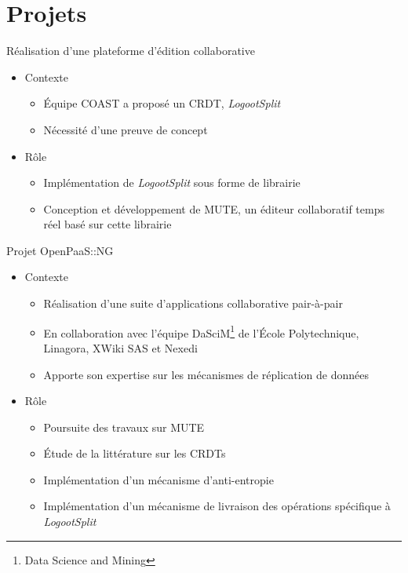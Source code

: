 \documentclass[xcolor=table]{beamer}
\begin{document}
\section{Projets}

\begin{frame}{Réalisation d'une plateforme d'édition collaborative}
  \begin{itemize}
	\item Contexte
		\begin{itemize}
		\item Équipe COAST a proposé un CRDT, \emph{LogootSplit}
		\item Nécessité d'une preuve de concept
		\end{itemize}
  \item Rôle
		\begin{itemize}
		\item Implémentation de \emph{LogootSplit} sous forme de librairie
		\item Conception et développement de MUTE, un éditeur collaboratif temps réel basé sur cette librairie
		\end{itemize}
  \end{itemize}
\end{frame}

\begin{frame}{Projet OpenPaaS::NG}
  \begin{itemize}
  \item Contexte
		\begin{itemize}
		\item Réalisation d'une suite d'applications collaborative pair-à-pair
		\item En collaboration avec l'équipe DaSciM\footnote{Data Science and Mining} de l'École Polytechnique, Linagora, XWiki SAS et Nexedi
		\item Apporte son expertise sur les mécanismes de réplication de données
		\end{itemize}
  \item Rôle
		\begin{itemize}
		\item Poursuite des travaux sur MUTE
		\item Étude de la littérature sur les CRDTs
		\item Implémentation d'un mécanisme d'anti-entropie
		\item Implémentation d'un mécanisme de livraison des opérations spécifique à \emph{LogootSplit}
		\end{itemize}
	\end{itemize}
\end{frame}
\end{document}
